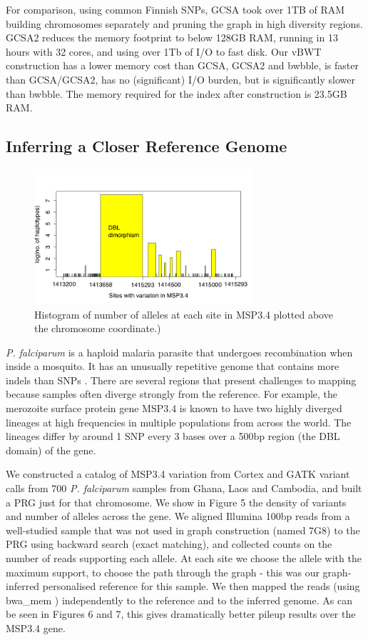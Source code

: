 \documentclass[runningheads,a4paper]{llncs}
\begin{document}
For comparison, using common Finnish SNPs, GCSA took over 1TB of RAM building chromosomes separately and pruning the graph in high diversity regions. GCSA2 reduces the memory footprint to below 128GB RAM, running in 13 hours with 32 cores, and using  over 1Tb of I/O to fast disk. Our vBWT construction has a lower memory cost than GCSA, GCSA2 and bwbble, is faster than GCSA/GCSA2, has no (significant) I/O burden, but is significantly slower than bwbble. The memory required for the index after construction is 23.5GB RAM.



\subsection{Inferring a Closer Reference Genome}

\begin{figure}
\centering
\includegraphics[height=5cm]{PRG.png}
\caption{Histogram of number of alleles at each site in MSP3.4 plotted above the chromosome coordinate.)}
\label{fig:example}
\end{figure}

\textit{P. falciparum} is a haploid malaria parasite that undergoes recombination when inside a mosquito. It has an unusually repetitive genome that contains more indels than SNPs \cite{miles}. There are several regions that present challenges to mapping because samples often diverge strongly from the reference. For example, the merozoite surface protein gene MSP3.4 is known to have two highly diverged lineages at high frequencies in multiple populations from across the world.  The lineages differ by around 1 SNP every 3 bases over a 500bp region (the DBL domain) of the gene.




We constructed a catalog of MSP3.4 variation from Cortex \cite{iqbal} and GATK \cite{depristo} variant calls from 700 \textit{P. falciparum} samples from Ghana, Laos and Cambodia, and built a PRG just for that chromosome. We show in Figure 5 the density of variants and number of alleles across the gene. We aligned Illumina 100bp reads from a well-studied sample that was not used in graph construction (named 7G8) to the PRG using backward search (exact matching), and collected counts on the number of reads supporting each allele. At each site we choose the allele with the maximum support, to choose the path through the graph -  this was our graph-inferred personalised reference for this sample. We then mapped the reads (using bwa\_mem \cite{hengli}) independently to the reference and to the inferred genome. As can be seen in Figures 6 and 7, this gives dramatically better pileup results over the MSP3.4 gene.
\end{document}
